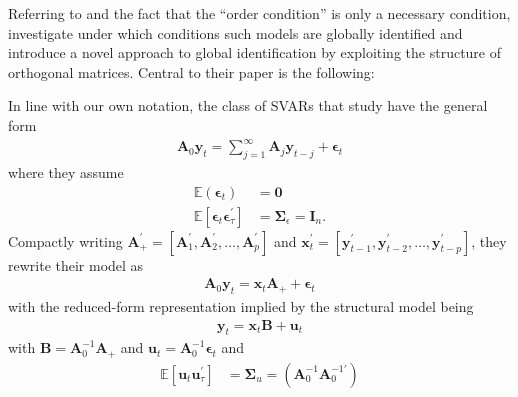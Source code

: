 \documentclass[a4paper,11pt,listof=nochaptergap,oneside,pointednumbers,bibtotoc,bigheadings,liststotoc,hidelinks]{scrbook}
\theoremstyle{mysatz}
\theoremstyle{mydefinition}
\theoremstyle{mytheorem}
\theoremstyle{mybemerkung}
\newcommand{\vect}[1]{\boldsymbol{\mathbf{#1}}}
\begin{document}
Referring to \citet{rothenberg:71} and the fact that the ``order condition'' is only a necessary condition, \citet{rubioetal:10} investigate under which conditions such models are globally identified and introduce a novel approach to global identification by exploiting the structure of orthogonal matrices. Central to their paper is the following: 

In line with our own notation, the class of SVARs that \citet{rubioetal:10} study have the general form
\begin{equation} \label{eq:svar_1}
\begin{split}
	\vect{A}_0 \vect{y}_t = \sum\limits_{j=1}^\infty \vect{A}_j\vect{y}_{t-j} + \vect{\epsilon}_t
\end{split}								
\end{equation}
where they assume 
\begin{equation}\label{eq:svar_2}
\begin{split}
	\mathbb{E}(\vect{\epsilon}_t) &  = \vect{0}  \\
	\mathbb{E}[\vect{\epsilon}_t\vect{\epsilon}_{\tau}^'] & = \vect{\Sigma}_\epsilon = \vect{I}_n.
\end{split}								
\end{equation}
Compactly writing $\vect{A}_{+}^' = [\vect{A}_1^', \vect{A}_2^', \dots, \vect{A}_p^']$ and $\vect{x}_{t}^' = [\vect{y}_{t-1}^', \vect{y}_{t-2}^', \dots, \vect{y}_{t-p}^']$, they rewrite their model as
\begin{equation}\label{eq:svar_3}
\begin{split}
	\vect{A}_0 \vect{y}_t =  \vect{x}_t \vect{A}_+ + \vect{\epsilon}_t
\end{split}								
\end{equation}
with the reduced-form representation implied by the structural model being
\begin{equation}\label{eq:svar_4}
\begin{split}
	 \vect{y}_t =  \vect{x}_t \vect{B} + \vect{u}_t
\end{split}								
\end{equation}
with $\vect{B} = \vect{A}_0^{-1}\vect{A}_+$ and $\vect{u}_t = \vect{A}_0^{-1}\vect{\epsilon}_t$ and
	\begin{equation} \label{eq:svar_5}
	\begin{split}
		\mathbb{E}[\vect{u}_t\vect{u}_{\tau}^'] & = 
      		\vect{\Sigma}_u = (\vect{A}_0^{-1}\vect{A}_0^{-1'})
	\end{split}								
	\end{equation}	
\end{document}
